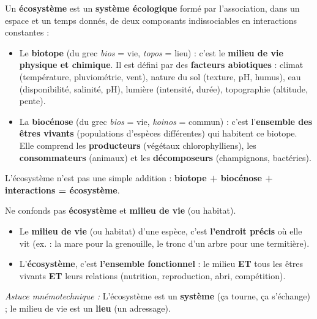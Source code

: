 \documentclass[11pt]{article}
\begin{document}
\begin{definition}
Un \textbf{écosystème} est un \textbf{système écologique} formé par l'association, dans un espace et un temps donnés, de deux composants indissociables en interactions constantes :
\begin{itemize}
    \item Le \textbf{biotope} (du grec \emph{bios} = vie, \emph{topos} = lieu) : c'est le \textbf{milieu de vie physique et chimique}. Il est défini par des \textbf{facteurs abiotiques} : climat (température, pluviométrie, vent), nature du sol (texture, pH, humus), eau (disponibilité, salinité, pH), lumière (intensité, durée), topographie (altitude, pente).
    \item La \textbf{biocénose} (du grec \emph{bios} = vie, \emph{koinos} = commun) : c'est l'\textbf{ensemble des êtres vivants} (populations d'espèces différentes) qui habitent ce biotope. Elle comprend les \textbf{producteurs} (végétaux chlorophylliens), les \textbf{consommateurs} (animaux) et les \textbf{décomposeurs} (champignons, bactéries).
\end{itemize}
L'écosystème n'est pas une simple addition : \textbf{biotope + biocénose + interactions = écosystème}.
\end{definition}

\begin{attention}
Ne confonds pas \textbf{écosystème} et \textbf{milieu de vie} (ou habitat).
\begin{itemize}
    \item Le \textbf{milieu de vie} (ou habitat) d'une espèce, c'est \textbf{l'endroit précis} où elle vit (ex. : la mare pour la grenouille, le tronc d'un arbre pour une termitière).
    \item L'\textbf{écosystème}, c'est \textbf{l'ensemble fonctionnel} : le milieu \textbf{ET} tous les êtres vivants \textbf{ET} leurs relations (nutrition, reproduction, abri, compétition).
\end{itemize}
\emph{Astuce mnémotechnique :} L'écosystème est un \textbf{système} (ça tourne, ça s'échange) ; le milieu de vie est un \textbf{lieu} (un adressage).
\end{attention}
\end{document}
